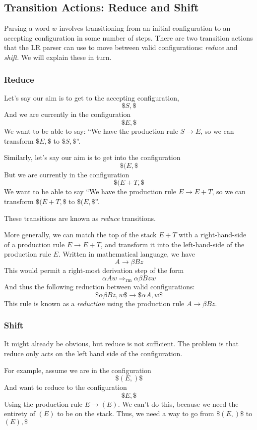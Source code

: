\subsection{Transition Actions: Reduce and Shift}\label{section:lr-shift-reduce}
Parsing a word $w$ involves transitioning from an initial configuration to an accepting configuration in some number of steps. There are two transition actions that the LR parser can use to move between valid configurations: \textit{reduce} and \textit{shift}. We will explain these in turn.

\subsubsection{Reduce}
Let's say our aim is to get to the accepting configuration, 
\[\$S, \$\]
And we are currently in the configuration
\[\$E, \$\]
We want to be able to say: ``We have the production rule $S \to E$, so we can transform $\$E, \$$ to $\$S, \$$''. 

Similarly, let's say our aim is to get into the configuration
\[\$(E, \$\]
But we are currently in the configuration
\[\$(E+T, \$\]
We want to be able to say ``We have the production rule $E \to E+T$, so we can transform $\$(E+T, \$$ to $\$(E, \$$''. 

These transitions are known as \textit{reduce} transitions.

More generally, we can match the top of the stack $E+T$ with a right-hand-side of a production rule $E \to E+T$, and transform it into the left-hand-side of the production rule $E$. Written in mathematical language, we have
\[ A \rightarrow \beta B z\]
This would permit a right-most derivation step of the form
\[\alpha A w \Rightarrow_{\text{rm}} \alpha \beta B z w\]
And thus the following reduction between valid configurations:
\[\$ \alpha \beta B z, w \$ \longrightarrow \$ \alpha A, w \$ \]
This rule is known as a \textit{reduction} using the production rule $A \rightarrow \beta B z$.

\subsubsection{Shift}
It might already be obvious, but reduce is not sufficient. The problem is that reduce only acts on the left hand side of the configuration. 

For example, assume we are in the configuration
\[\$(E, )\$\]
And want to reduce to the configuration
\[\$E, \$\]
Using the production rule $E \to (E)$. We can't do this, because we need the entirety of $(E)$ to be on the stack. Thus, we need a way to go from $\$(E, )\$$ to$(E), \$$

